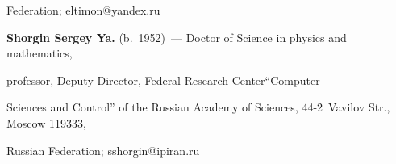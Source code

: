 Federation; \mbox{eltimon@yandex.ru} 





     \vspace*{3pt}


     


     \noindent


\textbf{Shorgin Sergey Ya.} (b.\ 1952)~--- Doctor of Science in physics and mathematics, 


professor, Deputy Director, Federal Research Center``Computer 


Sciences and Control'' of the Russian Academy of Sciences, 44-2~Vavilov Str., Moscow 119333, 


Russian Federation; \mbox{sshorgin@ipiran.ru} 


    


    


\label{end\stat}








\renewcommand{\bibname}{\protect\rm Литература}


